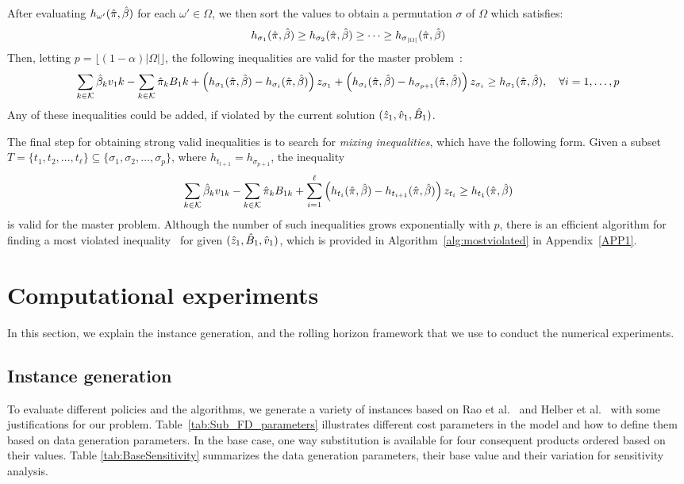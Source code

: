 \documentclass[10pt]{article}
\newcommand{\ka}{k} %
\newcommand{\KA}{\mathcal{K}}
\newcommand{\Bi}{B} %
\newcommand{\Vi}{v} %
\newcommand{\Zed}{z} %
\newcommand{\m}{\omega} %
\newcommand{\EM}{\Omega} %
\begin{document}
After evaluating $h_{\m'}(\pisol,\betasol)$ for each $\m' \in \EM$, we then sort the values to obtain a permutation $\sigma$ of $\EM$ which satisfies:
\[ h_{\sigma_1}(\pisol,\betasol) \geq h_{\sigma_2}(\pisol,\betasol)  \geq \cdots \geq h_{\sigma_{|\EM|}}(\pisol,\betasol)
 \]
Then, letting $p = \lfloor (1-\alpha) |\EM| \rfloor$, the following inequalities are valid for the master problem~\cite{luedtke2014branch}:
\[ \sum_{\ka  \in \KA} \betasol_k \Vi_1k - \sum_{\ka  \in \KA} \pisol_k \Bi_1k + 
\left(h_{\sigma_1}(\pisol,\betasol) - h_{\sigma_i}(\pisol,\betasol)\right)\Zed_{\sigma_1} + 
\left(h_{\sigma_i}(\pisol,\betasol) - h_{\sigma_{p+1}}(\pisol,\betasol)\right)\Zed_{\sigma_i} \geq h_{\sigma_1}(\pisol,\betasol), \quad \forall i=1,\ldots, p \]
Any of these inequalities could be added, if violated by the current solution $(\zsol_1,\vsol_1,\bsol_1)$.

The final step for obtaining strong valid inequalities is to search for {\it mixing inequalities}, which have the following form. Given a subset $T = \{t_1,t_2,\ldots,t_{\ell}\} \subseteq \{\sigma_1,\sigma_2,\ldots,\sigma_p\}$, where $h_{t_{l+1}}= h_{\sigma_{p+1}}$, the inequality
\[  \sum_{\ka  \in \KA} \betasol_k \Vi_{1k} - \sum_{\ka  \in \KA} \pisol_k \Bi_{1k} + 
\sum_{i=1}^{\ell} \left(h_{t_i}(\pisol,\betasol) - h_{t_{i+1}}(\pisol,\betasol)\right)\Zed_{t_i}
\geq  h_{t_1}(\pisol,\betasol) \]
is valid for the master problem. Although the number of such inequalities grows exponentially with $p$, there is an efficient algorithm for finding a most violated inequality~\cite{gunluk2001mixing} for given $(\zsol_1,\bsol_1,\vsol_1)$, which is provided in Algorithm~\ref{alg:mostviolated} in Appendix~\ref{APP1}. 




  

\section{Computational experiments}
In this section, we explain the instance generation, and the rolling horizon framework that we use to conduct the numerical experiments. 
\subsection{Instance generation}

To evaluate different policies and the algorithms, we generate a variety of instances based on Rao et al.~\cite{rao2004multi} and Helber et al.~\cite{helber2013dynamic} with some justifications for our problem. Table~\ref{tab:Sub_FD_parameters} illustrates different cost parameters in the model and how to define them based on data generation parameters. In the base case, one way substitution is available for four consequent products ordered based on their values.
Table \ref{tab:BaseSensitivity} summarizes the data generation parameters, their base value and their variation for sensitivity analysis.  
\end{document}
